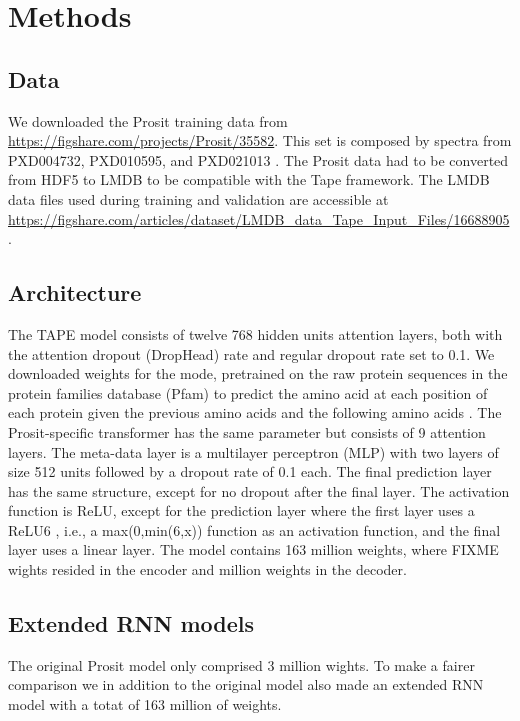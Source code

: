 \documentclass[10pt,a4paper]{article}
\begin{document}
\section*{Methods}
\subsection*{Data}
We downloaded the Prosit training data from \url{https://figshare.com/projects/Prosit/35582}.  This set is composed by spectra from PXD004732, PXD010595, and PXD021013 \cite{Gessulat2019-el, Wilhelm2021-mz}. The Prosit data had to be converted from HDF5 to LMDB to be compatible with the Tape framework. The LMDB data files used during training and validation are accessible at \url{https://figshare.com/articles/dataset/LMDB_data_Tape_Input_Files/16688905}.

\subsection*{Architecture}

The TAPE model consists of twelve 768 hidden units attention layers, both with the attention dropout (DropHead) rate \cite{Zhou2020-ji} and regular dropout rate set to 0.1. We downloaded weights for the mode, pretrained on the raw protein sequences in the protein families database (Pfam) to predict the amino acid at each position of each protein given the previous amino acids and the following amino acids \cite{Rao2019-qq}. The Prosit-specific transformer has the same parameter but consists of 9 attention layers. The meta-data layer is a multilayer perceptron (MLP) with two layers of size 512 units followed by a dropout rate of 0.1 each. The final prediction layer has the same structure, except for no dropout after the final layer.  The activation function is ReLU, except for the prediction layer where the first layer uses a ReLU6 \cite{Howard2017-yv}, i.e., a max(0,min(6,x)) function as an activation function, and the final layer uses a linear layer. The model contains 163 million weights, where FIXME wights resided in the encoder and  million weights in the decoder.

\subsection{Extended RNN models}

The original Prosit model only comprised 3 million wights. To make a fairer comparison we in addition to the original model also made an extended RNN model with a totat of 163 million of weights. 
\end{document}
